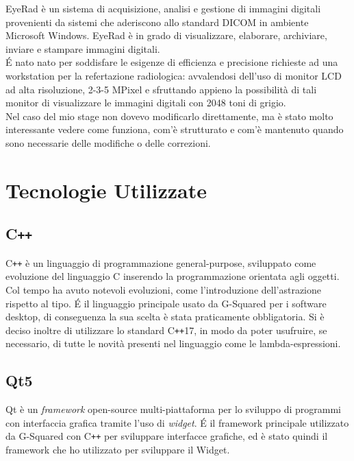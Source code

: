 EyeRad è un sistema di acquisizione, analisi e gestione di immagini digitali provenienti da sistemi che aderiscono allo standard DICOM in ambiente Microsoft Windows.
EyeRad è in grado di visualizzare, elaborare, archiviare, inviare e stampare immagini digitali.
\\
\'E nato nato per soddisfare le esigenze di efficienza e precisione richieste ad una workstation per la refertazione radiologica: avvalendosi dell’uso di monitor LCD ad alta risoluzione, 2-3-5 MPixel e sfruttando appieno la possibilità di tali monitor di visualizzare le immagini digitali con 2048 toni di grigio.
\\
Nel caso del mio stage non dovevo modificarlo direttamente, ma è stato molto interessante vedere come funziona, com'è strutturato e com'è mantenuto quando sono necessarie delle modifiche o delle correzioni.

\section{Tecnologie Utilizzate}
\subsection{C\texttt{++}}\label{sec:C++}
C\texttt{++} è un linguaggio di programmazione general-purpose, sviluppato come evoluzione del linguaggio C inserendo la programmazione orientata agli oggetti. Col tempo ha avuto notevoli evoluzioni, come l'introduzione dell'astrazione rispetto al tipo. \'E il linguaggio principale usato da G-Squared per i software desktop, di conseguenza la sua scelta è stata praticamente obbligatoria. Si è deciso inoltre di utilizzare lo standard C\texttt{++}17, in modo da poter usufruire, se necessario, di tutte le novità presenti nel linguaggio come le lambda-espressioni.

\subsection{Qt5}\label{sec:Qt5}
Qt è un \textit{framework} open-source multi-piattaforma per lo sviluppo di programmi con interfaccia grafica tramite l'uso di \textit{widget}.
\'E il framework principale utilizzato da G-Squared con C\texttt{++} per sviluppare interfacce grafiche, ed è stato quindi il framework che ho utilizzato per sviluppare il Widget.

\newpage
